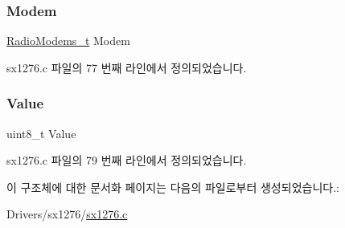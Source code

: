 \subsubsection{\texorpdfstring{Modem}{Modem}}
{\footnotesize\ttfamily \mbox{\hyperlink{radio_8h_a992ef7a5b7f52975ba7bd8dd97740057}{Radio\+Modems\+\_\+t}} Modem}



sx1276.\+c 파일의 77 번째 라인에서 정의되었습니다.

\mbox{\label{struct_radio_registers__t_a88f4d00bdab99ae6f48c7ae0bc468bb4}} 
\subsubsection{\texorpdfstring{Value}{Value}}
{\footnotesize\ttfamily uint8\+\_\+t Value}



sx1276.\+c 파일의 79 번째 라인에서 정의되었습니다.



이 구조체에 대한 문서화 페이지는 다음의 파일로부터 생성되었습니다.\+:\begin{DoxyCompactItemize}
\item 
Drivers/sx1276/\mbox{\hyperlink{sx1276_8c}{sx1276.\+c}}\end{DoxyCompactItemize}
